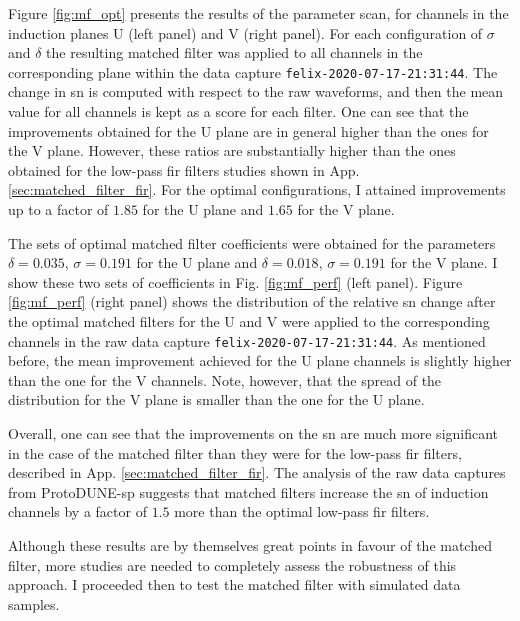 Figure \ref{fig:mf_opt} presents the results of the parameter scan, for channels in the induction planes U (left panel) and V (right panel). For each configuration of $\sigma$ and $\delta$ the resulting matched filter was applied to all channels in the corresponding plane within the data capture \texttt{felix-2020-07-17-21:31:44}. The change in \gls{sn} is computed with respect to the raw waveforms, and then the mean value for all channels is kept as a score for each filter. One can see that the improvements obtained for the U plane are in general higher than the ones for the V plane. However, these ratios are substantially higher than the ones obtained for the low-pass \gls{fir} filters studies shown in App. \ref{sec:matched_filter_fir}. For the optimal configurations, I attained improvements up to a factor of $1.85$ for the U plane and $1.65$ for the V plane.

The sets of optimal matched filter coefficients were obtained for the parameters $\delta = 0.035$, $\sigma = 0.191$ for the U plane and $\delta = 0.018$, $\sigma = 0.191$ for the V plane. I show these two sets of coefficients in Fig. \ref{fig:mf_perf} (left panel). Figure \ref{fig:mf_perf} (right panel) shows the distribution of the relative \gls{sn} change after the optimal matched filters for the U and V were applied to the corresponding channels in the raw data capture \texttt{felix-2020-07-17-21:31:44}. As mentioned before, the mean improvement achieved for the U plane channels is slightly higher than the one for the V channels. Note, however, that the spread of the distribution for the V plane is smaller than the one for the U plane.

Overall, one can see that the improvements on the \gls{sn} are much more significant in the case of the matched filter than they were for the low-pass \gls{fir} filters, described in App. \ref{sec:matched_filter_fir}. The analysis of the raw data captures from ProtoDUNE-\gls{sp} suggests that matched filters increase the \gls{sn} of induction channels by a factor of $1.5$ more than the optimal low-pass \gls{fir} filters.

Although these results are by themselves great points in favour of the matched filter, more studies are needed to completely assess the robustness of this approach. I proceeded then to test the matched filter with simulated data samples.

